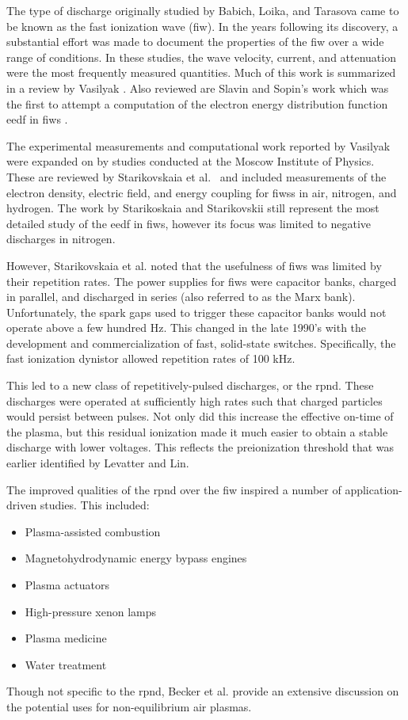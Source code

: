 The type of discharge originally studied by Babich, Loika, and Tarasova came to
be known as the fast ionization wave (\acs{fiw}). In the years following its
discovery, a substantial effort was made to document the properties of the
\acs{fiw} over a wide range of conditions. In these studies, the wave velocity,
current, and attenuation were the most frequently measured quantities. Much of
this work is summarized in a review by Vasilyak \cite{Vasilyak1994}. Also
reviewed are Slavin and Sopin's work which was the first to attempt a
computation of the electron energy distribution function \acs{eedf} in
\acs{fiw}s \cite{Slavin1992}.

The experimental measurements and computational work reported by Vasilyak were
expanded on by studies conducted at the Moscow Institute of Physics. These are
reviewed by Starikovskaia et al.~\cite{Starikovskaia2001} and included
measurements of the electron density, electric field, and energy coupling for
\acs{fiws}s in air, nitrogen, and hydrogen. The work by Starikoskaia and
Starikovskii still represent the most detailed study of the \acs{eedf}
in \acs{fiw}s, however its focus was limited to negative discharges in nitrogen.

However, Starikovskaia et al. noted that the usefulness of \acs{fiw}s was
limited by their repetition rates. The power supplies for \acs{fiw}s were
capacitor banks, charged in parallel, and discharged in series (also referred to
as the Marx bank). Unfortunately, the spark gaps used to trigger these
capacitor banks would not operate above a few hundred Hz. This changed in the
late 1990's with the development and commercialization of fast, solid-state
switches. Specifically, the fast ionization dynistor allowed repetition rates of
100 kHz.

This led to a new class of repetitively-pulsed discharges, or the \acs{rpnd}.
These discharges were operated at sufficiently high rates such that charged
particles would persist between pulses. Not only did this increase the effective
on-time of the plasma, but this residual ionization made it much easier to
obtain a stable discharge with lower voltages. This reflects the preionization
threshold that was earlier identified by Levatter and Lin.

The improved qualities of the \acs{rpnd} over the \acs{fiw} inspired a number of
application-driven studies. This included:
\begin{itemize}
  \item Plasma-assisted combustion \cite{Pancheshnyi2006, Starikovskaia2006}
  \item Magnetohydrodynamic energy bypass engines \cite{Macheret2002,
    Schneider2009a}
  \item Plasma actuators \cite{Starikovskii2009, Adamovich2009}
  \item High-pressure xenon lamps \cite{Nikandrov2008}
  \item Plasma medicine \cite{Ayan2009, Zimmerman2012}
  \item Water treatment \cite{Foster2013}
\end{itemize}
Though not specific to the \acs{rpnd}, Becker et al. \cite{Becker2005} provide
an extensive discussion on the potential uses for non-equilibrium air plasmas.

